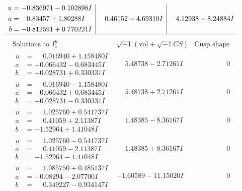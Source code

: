 \documentclass[1p]{elsarticle_modified}
\theoremstyle{definition}
\newcommand{\I}{\sqrt{-1}}
\begin{document}
$$\begin{array}{c|c|c}
\begin{aligned}
u &= -0.836971 - 0.102898 I \\
a &= \phantom{-}0.83457 + 1.80288 I \\
b &= -0.812591 + 0.770221 I\end{aligned}
 & \phantom{-}0.46152 - 4.69310 I & \phantom{-}4.12938 + 8.24884 I\\
 \hline 
 \end{array}$$\newpage$$\begin{array}{c|c|c}  
\text{Solutions to }I^u_{1}& \I (\text{vol} + \sqrt{-1}CS) & \text{Cusp shape}\\
 \hline 
\begin{aligned}
u &= \phantom{-}0.016940 + 1.158480 I \\
a &= -0.066432 - 0.683445 I \\
b &= -0.028731 + 0.330331 I\end{aligned}
 & \phantom{-}5.48738 - 2.71261 I & \phantom{-0.000000 } 0 \\ \hline\begin{aligned}
u &= \phantom{-}0.016940 - 1.158480 I \\
a &= -0.066432 + 0.683445 I \\
b &= -0.028731 - 0.330331 I\end{aligned}
 & \phantom{-}5.48738 + 2.71261 I & \phantom{-0.000000 } 0 \\ \hline\begin{aligned}
u &= \phantom{-}1.025760 + 0.541737 I \\
a &= \phantom{-}0.41059 + 2.11387 I \\
b &= -1.52964 + 1.41048 I\end{aligned}
 & \phantom{-}1.48385 - 8.36167 I & \phantom{-0.000000 } 0 \\ \hline\begin{aligned}
u &= \phantom{-}1.025760 - 0.541737 I \\
a &= \phantom{-}0.41059 - 2.11387 I \\
b &= -1.52964 - 1.41048 I\end{aligned}
 & \phantom{-}1.48385 + 8.36167 I & \phantom{-0.000000 } 0 \\ \hline\begin{aligned}
u &= \phantom{-}1.085750 + 0.485137 I \\
a &= -0.08294 - 2.07700 I \\
b &= \phantom{-}0.349227 - 0.934147 I\end{aligned}
 & -1.60589 - 11.15020 I & \phantom{-0.000000 } 0 \\ \hline\begin{aligned}

\end{aligned}
\end{array}$$
\end{document}
